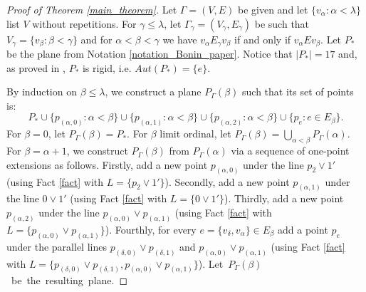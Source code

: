 \documentclass{amsart}
\renewcommand{\leq}{\leqslant}
\numberwithin{claimcounter}{theorem}
\begin{document}
	\begin{proof}[Proof of Theorem \ref{main_theorem}] Let $\Gamma = (V, E)$ be given and let $\{ v_{\alpha} : \alpha < \lambda \}$ list $V$ without repetitions. For $\gamma \leq \lambda$, let $\Gamma_{\gamma} = (V_{\gamma}, E_{\gamma})$ be such that $V_{\gamma} = \{ v_{\beta} : \beta < \gamma \}$ and for ${\alpha} < \beta < \gamma$ we have $v_{\alpha} E_{\gamma} v_{\beta}$ if and only if $v_{\alpha} E v_{\beta}$. Let $P_*$ be the plane from Notation \ref{notation_Bonin_paper}. Notice that $|P_*| = 17$ and, as proved in \cite[Lemma 2]{bonin}, $P_*$ is rigid, i.e. $Aut(P_*) = \{ e \}$.
	
\smallskip
\noindent By induction on $\beta \leq \lambda$, we construct a plane $P_{\Gamma}(\beta)$ such that its set of points is:
	\begin{equation}\label{equation_points} \tag{$*$}
	 P_* \cup \{ p_{(\alpha, 0)} : \alpha < \beta \} \cup \{ p_{(\alpha, 1)} : \alpha < \beta \} \cup \{ p_{(\alpha, 2)} : \alpha < \beta \} \cup \{ p_e : e \in E_{\beta} \}.
\end{equation}
For $\beta = 0$, let $P_{\Gamma}(\beta) = P_*$. For $\beta$ limit ordinal, let $P_{\Gamma}(\beta) = \bigcup_{\alpha < \beta} P_{\Gamma}(\alpha)$. For $\beta = \alpha + 1$, we construct $P_{\Gamma}(\beta)$ from $P_{\Gamma}(\alpha)$ via a sequence of one-point extensions as follows. Firstly, add a new point $p_{(\alpha, 0)}$ under the line $p_2 \vee 1'$ (using Fact \ref{fact} with $L = \{p_2 \vee 1'\}$). Secondly, add a new point $p_{(\alpha, 1)}$ under the line $0 \vee 1'$ (using Fact \ref{fact} with $L = \{0 \vee 1'\}$). Thirdly, add a new point $p_{(\alpha, 2)}$ under the line $p_{(\alpha, 0)} \vee p_{(\alpha, 1)}$ (using Fact \ref{fact} with $L = \{ p_{(\alpha, 0)} \vee p_{(\alpha, 1)}\}$). Fourthly, for every $e = \{ v_{\delta}, v_{\alpha} \} \in E_{\beta}$ add a point $p_e$ under the parallel lines $p_{(\delta, 0)} \vee p_{(\delta, 1)}$ and $p_{(\alpha, 0)} \vee p_{(\alpha, 1)}$ (using Fact \ref{fact} with $L = \{ p_{(\delta, 0)} \vee p_{(\delta, 1)},  p_{(\alpha, 0)} \vee p_{(\alpha, 1)} \}$). \mbox{Let $P_{\Gamma}(\beta)$ be the resulting plane.}


\end{proof}
\end{document}
